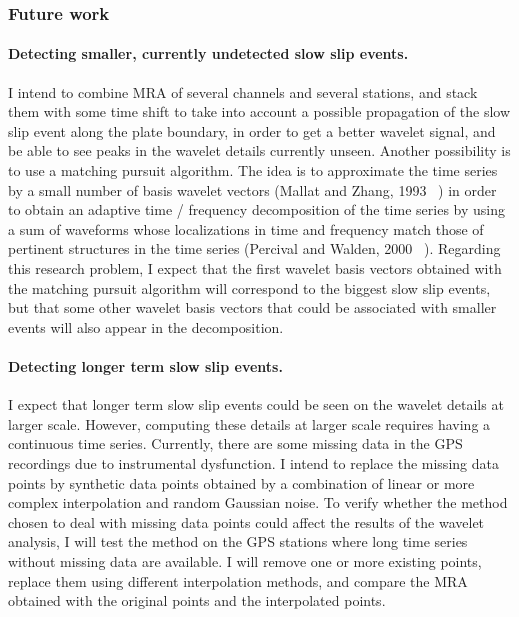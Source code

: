 \documentclass[letterpaper, 12pt]{article}
\begin{document}
\subsubsection*{Future work}

\paragraph{Detecting smaller, currently undetected slow slip events.} I intend to combine MRA of several channels and several stations, and stack them with some time shift to take into account a possible propagation of the slow slip event along the plate boundary, in order to get a better wavelet signal, and be able to see peaks in the wavelet details currently unseen. Another possibility is to use a matching pursuit algorithm. The idea is to approximate the time series by a small number of basis wavelet vectors (Mallat and Zhang, 1993 ~\cite{MAL_1993}) in order to obtain an adaptive time / frequency decomposition of the time series by using a sum of waveforms whose localizations in time and frequency match those of pertinent structures in the time series (Percival and Walden, 2000 ~\cite{PER_2000}). Regarding this research problem, I expect that the first wavelet basis vectors obtained with the matching pursuit algorithm will correspond to the biggest slow slip events, but that some other wavelet basis vectors that could be associated with smaller events will also appear in the decomposition.

\paragraph{Detecting longer term slow slip events.} I expect that longer term slow slip events could be seen on the wavelet details at larger scale. However, computing these details at larger scale requires having a continuous time series. Currently, there are some missing data in the GPS recordings due to instrumental dysfunction. I intend to replace the missing data points by synthetic data points obtained by a combination of linear or more complex interpolation and random Gaussian noise. To verify whether the method chosen to deal with missing data points could affect the results of the wavelet analysis, I will test the method on the GPS stations where long time series without missing data are available. I will remove one or more existing points, replace them using different interpolation methods, and compare the MRA obtained with the original points and the interpolated points.
\end{document}
